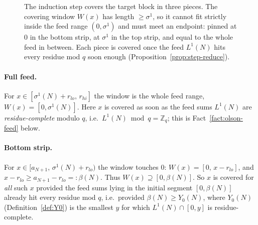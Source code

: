 \documentclass[11pt]{amsart}
\theoremstyle{plain}
\theoremstyle{definition}
\newcommand{\Z}{\mathbb{Z}}
\begin{document}
\begin{figure}[h]
\centering
{}
\caption{The induction step covers the target block in three pieces.  The covering
window $W(x)$ has length $\ge\sigma^1$, so it cannot fit strictly inside the feed
range $(0,\sigma^1)$ and must meet an endpoint: pinned at $0$ in the bottom strip,
at $\sigma^1$ in the top strip, and equal to the whole feed in between.  Each piece
is covered once the feed $L^1(N)$ hits every residue mod $q$ soon enough
(Proposition~\ref{prop:step-reduce}).}
\label{fig:strips}
\end{figure}

\paragraph{Full feed.}
For $x\in[\sigma^1(N)+r_{lo},\,r_{hi}]$ the window is the whole feed range,
$W(x)=[0,\sigma^1(N)]$.  Here $x$ is covered as soon as the feed sums $L^1(N)$ are
\emph{residue-complete} modulo $q$, i.e.\ $L^1(N)\bmod q=\Z_q$; this is
Fact~\ref{fact:olson-feed} below.

\paragraph{Bottom strip.}
For $x\in[a_{N+1},\,\sigma^1(N)+r_{lo})$ the window touches $0$:
$W(x)=[0,\,x-r_{lo}]$, and $x-r_{lo}\ge a_{N+1}-r_{lo}=:\beta(N)$.  Thus
$W(x)\supseteq[0,\beta(N)]$.  So $x$ is covered for \emph{all} such $x$ provided the
feed sums lying in the initial segment $[0,\beta(N)]$ already hit every residue mod
$q$, i.e.\ provided $\beta(N)\ge Y_0(N)$, where $Y_0(N)$ (Definition~\ref{def:Y0}) is
the smallest $y$ for which $L^1(N)\cap[0,y]$ is residue-complete.
\end{document}
